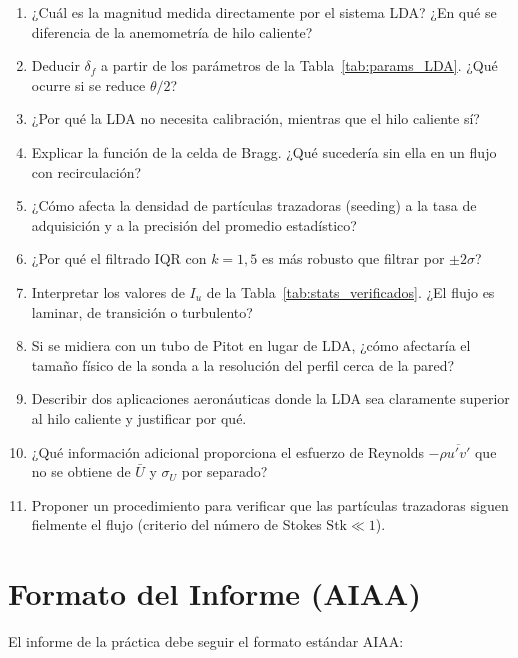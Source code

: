\documentclass[12pt,a4paper]{article}
\begin{document}
\begin{enumerate}
	\item ¿Cuál es la magnitud medida directamente por el sistema LDA?
	      ¿En qué se diferencia de la anemometría de hilo caliente?
	\item Deducir $\delta_f$ a partir de los parámetros de la
	      Tabla~\ref{tab:params_LDA}.  ¿Qué ocurre si se reduce $\theta/2$?
	\item ¿Por qué la LDA no necesita calibración, mientras que el hilo
	      caliente sí?
	\item Explicar la función de la celda de Bragg.  ¿Qué sucedería sin ella
	      en un flujo con recirculación?
	\item ¿Cómo afecta la densidad de partículas trazadoras (seeding) a la
	      tasa de adquisición y a la precisión del promedio estadístico?
	\item ¿Por qué el filtrado IQR con $k = 1{,}5$ es más robusto que
	      filtrar por $\pm 2\sigma$?
	\item Interpretar los valores de $I_u$ de la
	      Tabla~\ref{tab:stats_verificados}.  ¿El flujo es laminar, de
	      transición o turbulento?
	\item Si se midiera con un tubo de Pitot en lugar de LDA, ¿cómo
	      afectaría el tamaño físico de la sonda a la resolución del perfil
	      cerca de la pared?
	\item Describir dos aplicaciones aeronáuticas donde la LDA sea
	      claramente superior al hilo caliente y justificar por qué.
	\item ¿Qué información adicional proporciona el esfuerzo de Reynolds
	      $-\rho\overline{u'v'}$ que no se obtiene de $\bar{U}$ y
	      $\sigma_U$ por separado?
	\item Proponer un procedimiento para verificar que las partículas
	      trazadoras siguen fielmente el flujo (criterio del número de
	      Stokes $\mathrm{Stk} \ll 1$).
\end{enumerate}

\section{Formato del Informe (AIAA)}
\label{sec:formato}

El informe de la práctica debe seguir el formato estándar AIAA:
\end{document}
